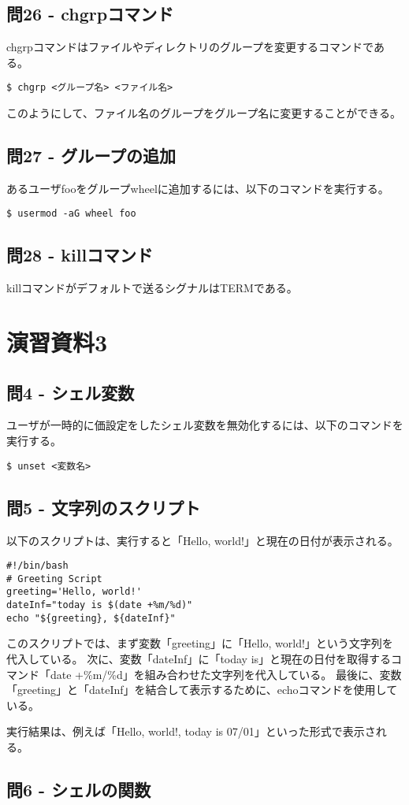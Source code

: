 \documentclass[a4paper,11pt]{jsarticle}
\begin{document}
\subsection*{問26 - chgrpコマンド}
chgrpコマンドはファイルやディレクトリのグループを変更するコマンドである。
\begin{lstlisting}[caption=問26の解答]
    $ chgrp <グループ名> <ファイル名>
\end{lstlisting}
このようにして、ファイル名のグループをグループ名に変更することができる。

\subsection*{問27 - グループの追加}
あるユーザfooをグループwheelに追加するには、以下のコマンドを実行する。
\begin{lstlisting}[caption=問27の解答]
    $ usermod -aG wheel foo
\end{lstlisting}

\subsection*{問28 - killコマンド}
killコマンドがデフォルトで送るシグナルはTERMである。

\section*{演習資料3}
\subsection*{問4 - シェル変数}
ユーザが一時的に価設定をしたシェル変数を無効化するには、以下のコマンドを実行する。
\begin{lstlisting}[caption=問4の解答]
    $ unset <変数名>
\end{lstlisting}

\subsection*{問5 - 文字列のスクリプト}
以下のスクリプトは、実行すると「Hello, world!」と現在の日付が表示される。

\begin{lstlisting}[caption=問4の解答]
#!/bin/bash
# Greeting Script
greeting='Hello, world!'
dateInf="today is $(date +%m/%d)"
echo "${greeting}, ${dateInf}"
\end{lstlisting}

このスクリプトでは、まず変数「greeting」に「Hello, world!」という文字列を代入している。
次に、変数「dateInf」に「today is」と現在の日付を取得するコマンド「date +\%m/\%d」を組み合わせた文字列を代入している。
最後に、変数「greeting」と「dateInf」を結合して表示するために、echoコマンドを使用している。

実行結果は、例えば「Hello, world!, today is 07/01」といった形式で表示される。

\subsection*{問6 - シェルの関数}
\end{document}
